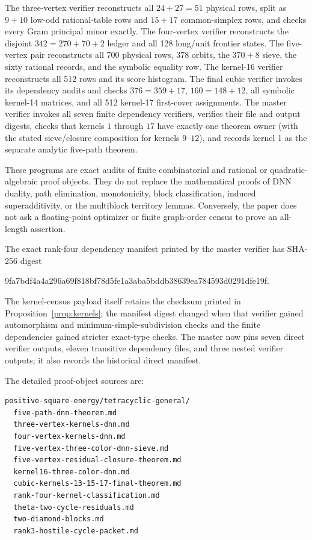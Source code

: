 \documentclass[11pt]{article}
\theoremstyle{remark}
\begin{document}
The three-vertex verifier reconstructs all $24+27=51$ physical rows, split as
$9+10$ low-odd rational-table rows and $15+17$ common-simplex rows, and checks
every Gram principal minor exactly.  The four-vertex verifier reconstructs the disjoint
$342=270+70+2$ ledger and all 128 long/unit frontier states.  The five-vertex
pair reconstructs all 700 physical rows, 378 orbits, the
$370+8$ sieve, the sixty rational records, and the symbolic equality row.  The
kernel-16 verifier reconstructs all 512 rows and its score histogram.  The
final cubic verifier invokes its dependency audits and checks
$376=359+17$, $160=148+12$, all symbolic kernel-14 matrices, and all 512
kernel-17 first-cover assignments.  The master verifier invokes all seven
finite dependency verifiers, verifies their file and output digests, checks
that kernels $1$ through $17$ have exactly one theorem owner (with the stated
sieve/closure composition for kernels $9$--$12$), and records kernel 1 as the
separate analytic five-path theorem.

These programs are exact audits of finite combinatorial and rational or
quadratic-algebraic proof objects.  They do not replace the mathematical proofs
of DNN duality, path elimination, monotonicity, block classification, induced
superadditivity, or the multiblock territory lemmas.  Conversely, the paper
does not ask a floating-point optimizer or finite graph-order census to prove
an all-length assertion.

The exact rank-four dependency manifest printed by the master verifier has
SHA-256 digest
\begin{center}\ttfamily\small
9fa7bdf4a4a296a69f818bf78d5fe1a3aba5bddb38639ea784593d0291dfe19f.
\end{center}
The kernel-census payload itself retains the checksum printed in
Proposition~\ref{prop:kernels}; the manifest digest changed when that verifier
gained automorphism and minimum-simple-subdivision checks and the finite
dependencies gained stricter exact-type checks.  The master now pins seven
direct verifier outputs, eleven transitive dependency files, and three nested
verifier outputs; it also records the historical direct manifest.

The detailed proof-object sources are:
\begin{verbatim}
positive-square-energy/tetracyclic-general/
  five-path-dnn-theorem.md
  three-vertex-kernels-dnn.md
  four-vertex-kernels-dnn.md
  five-vertex-three-color-dnn-sieve.md
  five-vertex-residual-closure-theorem.md
  kernel16-three-color-dnn.md
  cubic-kernels-13-15-17-final-theorem.md
  rank-four-kernel-classification.md
  theta-two-cycle-residuals.md
  two-diamond-blocks.md
  rank3-hostile-cycle-packet.md
\end{verbatim}
\end{document}
